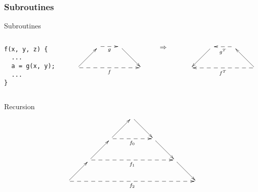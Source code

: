 \documentclass[10pt]{beamer}
\begin{document}
\begin{frame}[fragile]
  \frametitle{Subroutines}
  
  \begin{block}{Subroutines}
    \begin{columns}
      \begin{column}{0.33\textwidth}
        \begin{center}
          \begin{minipage}{0.7\textwidth}
            \footnotesize
\begin{verbatim}
f(x, y, z) {
  ...
  a = g(x, y);
  ...
}
\end{verbatim}    
          \end{minipage}
        \end{center}
      \end{column}
      \begin{column}{0.33\textwidth}
        \[\xymatrix{
          & \ar@{-->}[r]_g & \ar[dr] & \\
          \ar[ur]\ar@{-->}[rrr]_f &&& 
        }\]
      \end{column}
      \begin{column}{0.01\textwidth}
        $\Rightarrow$
      \end{column}
      \begin{column}{0.33\textwidth}
        \[\xymatrix{
          &\ar[dl] & \ar@{-->}[l]^{g^T} & \\
          &&& \ar[ul]\ar@{-->}[lll]^{f^T}
        }\]
        \end{column}
    \end{columns}
  \end{block}


  \begin{block}{Recursion}
    \[\xymatrix{
      &&& \ar[dr]\\
      & & \ar[ur]\ar@{-->}[rr]_{f_0} && \ar[dr] \\
      & \ar[ur] \ar@{-->}[rrrr]_{f_1} &&&& \ar[dr] \\
      \ar[ur] \ar@{-->}[rrrrrr]_{f_2} &&&&&&
    }\]
  \end{block}
\end{frame}
\end{document}
